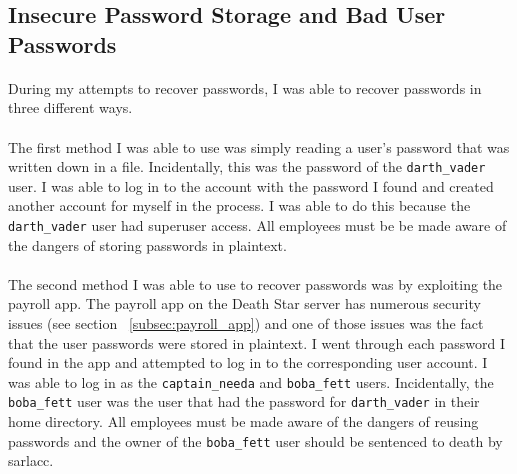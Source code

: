 \documentclass{article}
\begin{document}
\subsection{Insecure Password Storage and Bad User Passwords}
\label{subsec:bad_passwords}
\paragraph{}
During my attempts to recover passwords, I was able to recover passwords in three different ways.
\paragraph{}
The first method I was able to use was simply reading a user's password that was written down in a file. Incidentally, this was the password of the \texttt{darth\_vader} user.
I was able to log in to the account with the password I found and created another account for myself in the process. I was able to do this because the \texttt{darth\_vader} user had superuser access. All employees must be be made aware of the dangers of storing passwords in plaintext.
\paragraph{}
The second method I was able to use to recover passwords was by exploiting the payroll app.
The payroll app on the Death Star server has numerous security issues (see section ~\ref{subsec:payroll_app}) and one of those issues was the fact that the user passwords were stored in plaintext.
I went through each password I found in the app and attempted to log in to the corresponding user account.
I was able to log in as the \texttt{captain\_needa} and \texttt{boba\_fett} users. Incidentally, the \texttt{boba\_fett} user was the user that had the password for \texttt{darth\_vader} in their home directory. All employees must be made aware of the dangers of reusing passwords and the owner of the \texttt{boba\_fett} user should be sentenced to death by sarlacc.
\end{document}
